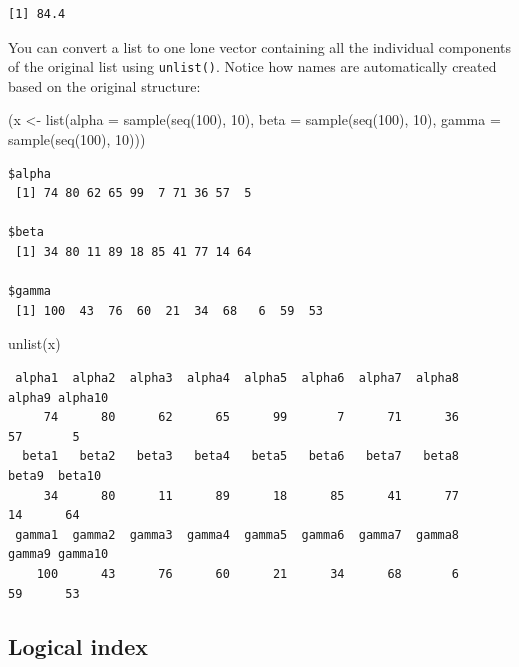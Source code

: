 \documentclass[
]{book}
\newenvironment{Shaded}{\begin{snugshade}}{\end{snugshade}}
\newcommand{\AttributeTok}[1]{\textcolor[rgb]{0.77,0.63,0.00}{#1}}
\newcommand{\DecValTok}[1]{\textcolor[rgb]{0.00,0.00,0.81}{#1}}
\newcommand{\FunctionTok}[1]{\textcolor[rgb]{0.00,0.00,0.00}{#1}}
\newcommand{\NormalTok}[1]{#1}
\newcommand{\OtherTok}[1]{\textcolor[rgb]{0.56,0.35,0.01}{#1}}
\begin{document}
\begin{verbatim}
[1] 84.4
\end{verbatim}

You can convert a list to one lone vector containing all the individual components of the original list using \texttt{unlist()}. Notice how names are automatically created based on the original structure:

\begin{Shaded}
\begin{Highlighting}[]
\NormalTok{(x }\OtherTok{\textless{}{-}} \FunctionTok{list}\NormalTok{(}\AttributeTok{alpha =} \FunctionTok{sample}\NormalTok{(}\FunctionTok{seq}\NormalTok{(}\DecValTok{100}\NormalTok{), }\DecValTok{10}\NormalTok{),}
          \AttributeTok{beta =} \FunctionTok{sample}\NormalTok{(}\FunctionTok{seq}\NormalTok{(}\DecValTok{100}\NormalTok{), }\DecValTok{10}\NormalTok{),}
          \AttributeTok{gamma =} \FunctionTok{sample}\NormalTok{(}\FunctionTok{seq}\NormalTok{(}\DecValTok{100}\NormalTok{), }\DecValTok{10}\NormalTok{)))}
\end{Highlighting}
\end{Shaded}

\begin{verbatim}
$alpha
 [1] 74 80 62 65 99  7 71 36 57  5

$beta
 [1] 34 80 11 89 18 85 41 77 14 64

$gamma
 [1] 100  43  76  60  21  34  68   6  59  53
\end{verbatim}

\begin{Shaded}
\begin{Highlighting}[]
\FunctionTok{unlist}\NormalTok{(x)}
\end{Highlighting}
\end{Shaded}

\begin{verbatim}
 alpha1  alpha2  alpha3  alpha4  alpha5  alpha6  alpha7  alpha8  alpha9 alpha10 
     74      80      62      65      99       7      71      36      57       5 
  beta1   beta2   beta3   beta4   beta5   beta6   beta7   beta8   beta9  beta10 
     34      80      11      89      18      85      41      77      14      64 
 gamma1  gamma2  gamma3  gamma4  gamma5  gamma6  gamma7  gamma8  gamma9 gamma10 
    100      43      76      60      21      34      68       6      59      53 
\end{verbatim}

\hypertarget{idllist}{%
\subsection{Logical index}\label{idllist}}
\end{document}
